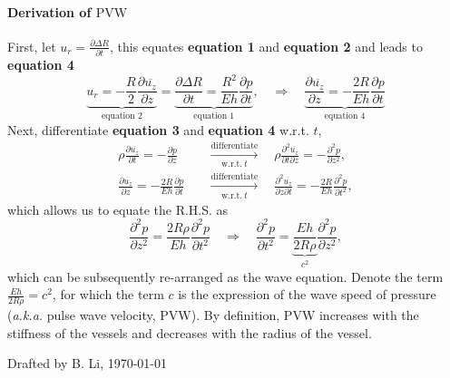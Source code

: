 \documentclass[a4paper]{article}
\begin{document}
\paragraph{Derivation of $\mathrm{PVW}$}
First, let $\displaystyle u_r = \frac{\partial \Delta R}{\partial t}$, this equates \textbf{equation 1} and \textbf{equation 2} and leads to \textbf{equation 4}
\[
    \underbrace{u_r = - \frac{R}{2} \frac{\partial \overline{u_{z}}}{\partial z}}_{\text{equation 2}} 
    = \underbrace{\frac{\partial \Delta R}{\partial t} = \frac{R^2}{Eh} \frac{\partial p}{\partial t}}_{\text{equation 1}},
    \quad \Rightarrow \quad
    \underbrace{\frac{\partial \overline{u_{z}}}{\partial z} = -\frac{2R}{Eh} \frac{\partial p}{\partial t}}_{\text{equation 4}}
\]
Next, differentiate \textbf{equation 3} and \textbf{equation 4} w.r.t. $t$,
\begin{align*}
    \rho \frac{\partial \overline{u_z}}{\partial t} = - \frac{\partial p}{\partial z} 
    & \quad \xrightarrow[\text{w.r.t.} \ t]{\text{differentiate}} \quad 
    \rho \frac{\partial^2 \overline{u_z}}{\partial t \partial z} = - \frac{\partial^2 p}{\partial z^2} , \\
    \frac{\partial \overline{u_{z}}}{\partial z}
    = -\frac{2R}{Eh} \frac{\partial p}{\partial t}
    & \quad \xrightarrow[\text{w.r.t.} \ t]{\text{differentiate}} \quad 
    \frac{\partial^2 \overline{u_{z}}}{\partial z \partial t}
    = -\frac{2R}{Eh} \frac{\partial^2 p}{\partial t^2},
\end{align*}
which allows us to equate the R.H.S. as  
\[
    \frac{\partial^2 p}{\partial z^2} = \frac{2 R \rho}{Eh} \frac{\partial^2 p}{\partial t^2}
    \quad \Rightarrow \quad
    \frac{\partial^2 p}{\partial t^2} = \underbrace{\frac{Eh}{2 R \rho}}_{c^2} \frac{\partial^2 p}{\partial z^2},
\]
which can be subsequently re-arranged as the wave equation. Denote the term $\displaystyle \frac{Eh}{2R\rho} = c^2$, for which the term $c$ is the expression of the wave speed of pressure (\textit{a.k.a.} pulse wave velocity, $\mathrm{PVW}$). By definition, $\mathrm{PVW}$ increases with the stiffness of the vessels and decreases with the radius of the vessel.


\vfill
{\small \color{gray}Drafted by B. Li, \today}
% 
\end{document}
